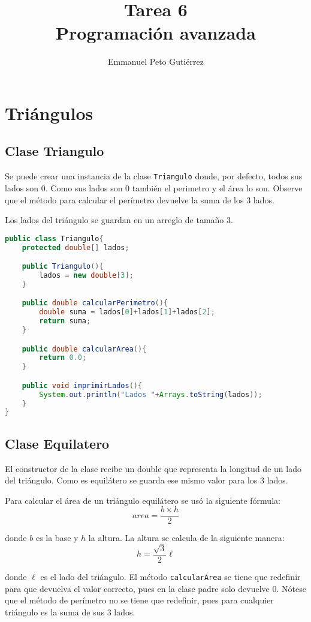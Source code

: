 \documentclass{article}
\title{Tarea 6\\Programación avanzada}
\author{Emmanuel Peto Gutiérrez}
\begin{document}
\maketitle

\section{Triángulos}

\subsection{Clase Triangulo}

Se puede crear una instancia de la clase \texttt{Triangulo} donde, por defecto, todos sus lados son 0. Como sus lados son 0 también el perimetro y el área lo son. Observe que el método para calcular el perímetro devuelve la suma de los 3 lados.

Los lados del triángulo se guardan en un arreglo de tamaño 3.

\begin{lstlisting}[language=Java]
public class Triangulo{
    protected double[] lados;

    public Triangulo(){
        lados = new double[3];
    }

    public double calcularPerimetro(){
        double suma = lados[0]+lados[1]+lados[2];
        return suma;
    }

    public double calcularArea(){
        return 0.0;
    }

    public void imprimirLados(){
        System.out.println("Lados "+Arrays.toString(lados));
    }
}
\end{lstlisting}

\subsection{Clase Equilatero}

El constructor de la clase recibe un double que representa la longitud de un lado del triángulo. Como es equilátero  se guarda ese mismo valor para los 3 lados.

Para calcular el área de un triángulo equilátero se usó la siguiente fórmula: \[area = \frac{b \times h}{2}\]

donde $b$ es la base y $h$ la altura. La altura se calcula de la siguiente manera: \[h = \frac{\sqrt{3}}{2} \ell\]

donde $\ell$ es el lado del triángulo. El método \texttt{calcularArea} se tiene que redefinir para que devuelva el valor correcto, pues en la clase padre solo devuelve 0. Nótese que el método de perímetro no se tiene que redefinir, pues para cualquier triángulo es la suma de sus 3 lados.
\end{document}
